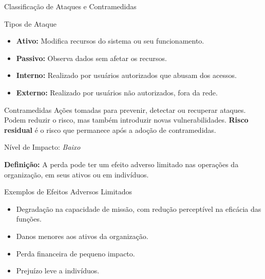 \begin{frame}{Classificação de Ataques e Contramedidas}
\begin{block}{Tipos de Ataque}
\begin{itemize}
  \item \textbf{Ativo:} Modifica recursos do sistema ou seu funcionamento.
  \item \textbf{Passivo:} Observa dados sem afetar os recursos.
\end{itemize}

\begin{itemize}
  \item \textbf{Interno:} Realizado por usuários autorizados que abusam dos acessos.
  \item \textbf{Externo:} Realizado por usuários não autorizados, fora da rede.
\end{itemize}
\end{block}

\begin{block}{Contramedidas}
Ações tomadas para prevenir, detectar ou recuperar ataques.  
Podem reduzir o risco, mas também introduzir novas vulnerabilidades.  
\textbf{Risco residual} é o risco que permanece após a adoção de contramedidas.
\end{block}
\end{frame}

\begin{frame}{Nível de Impacto: \textit{Baixo}}

\textbf{Definição:}  
A perda pode ter um efeito adverso limitado nas operações da organização, em seus ativos ou em indivíduos.

\vspace{0.5em}
\begin{block}{Exemplos de Efeitos Adversos Limitados}
\begin{itemize}
    \item Degradação na capacidade de missão, com redução perceptível na eficácia das funções.
    \item Danos menores aos ativos da organização.
    \item Perda financeira de pequeno impacto.
    \item Prejuízo leve a indivíduos.
\end{itemize}
\end{block}

\end{frame}


